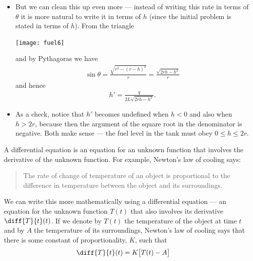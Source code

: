 \begin{eg}
\begin{itemize}
\item But we can clean this up even more --- instead of writing this rate in terms of
$\theta$ it is more natural to write it in terms of $h$ (since the initial problem is
stated in terms of $h$). From the triangle
\begin{efig}
\begin{center}
       \texttt{[image: fuel6]}
\end{center}
\end{efig}
and by Pythagoras we have
\begin{align*}
  \sin\theta =\frac{\sqrt{r^2-(r-h)^2}}{r}=\frac{\sqrt{2rh-h^2}}{r}
\end{align*}
and hence
\begin{align*}
  h' = \frac{q}{2L\sqrt{2rh-h^2}}.
\end{align*}

\item As a check, notice that $h'$ becomes undefined when $h<0$ and also when $h>2r$,
because then the argument of the square root in the denominator is negative. Both make
sense --- the fuel level in the tank must obey $0\le h\le 2r$.
\end{itemize}

\end{eg}



\label{sec:ExpGthDecay}
A differential equation is an equation for an unknown function
that involves the derivative of the unknown function. For example,
Newton's law of cooling says:
\begin{quote}
    The rate of change of temperature of an object is proportional
    to the difference in temperature between the object and its
    surroundings.
\end{quote}
We can write this more mathematically using a differential equation --- an equation for
the unknown function $T(t)$ that also involves its derivative $\diff{T}{t}(t)$.
If we denote by $T(t)$ the temperature of the
object at time $t$ and by $A$ the temperature of its surroundings, Newton's law of
cooling says that there is some constant of proportionality,
$K$, such that
\begin{align*}
    \diff{T}{t}(t) &= K\big[T(t)-A\big]
\end{align*}


